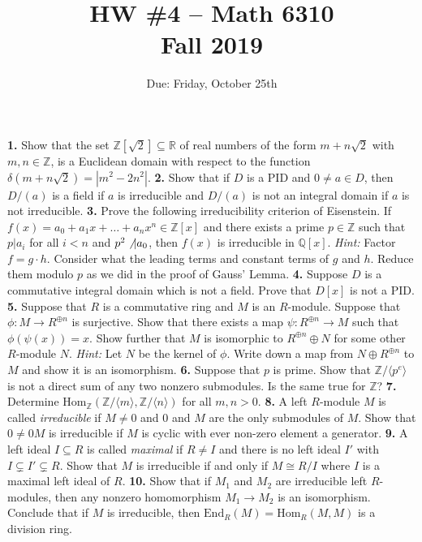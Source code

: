 \documentclass[11pt]{amsart}
\renewcommand{\to}[1][]{\xrightarrow{\ #1\ }}
\newcommand{\bR}{{\mathbb{R}}}
\newcommand{\bQ}{\mathbb{Q}}
\newcommand{\bZ}{\mathbb{Z}}
\newcommand{\Hom}{\mathrm{Hom}}
\newcommand{\End}{\mathrm{End}}
\begin{document}
\title{HW \#4 -- Math 6310\\Fall 2019}
\author{Due: Friday, October 25th}
\maketitle
\noindent
{\bf 1.}  Show that the set $\bZ[\sqrt{2}] \subseteq \bR$ of real numbers of the form $m + n \sqrt{2}$ with $m, n \in \bZ$, is a Euclidean domain with respect to the function $\delta(m + n\sqrt{2}) = |m^2 - 2n^2|$.  
\newpage
\noindent
{\bf 2.}  Show that if $D$ is a PID and $0 \neq a \in D$, then $D/(a)$ is a field if $a$ is irreducible and $D/(a)$ is not an integral domain if $a$ is not irreducible.
\newpage
\noindent
{\bf 3.}  Prove the following irreducibility criterion of Eisenstein.  If $f(x) = a_0 + a_1 x + \dots + a_n x^n \in \bZ[x]$ and there exists a prime $p \in \bZ$ such that $p | a_i$ for all $i < n$ and $p^2 \not\,| a_0$, then $f(x)$ is irreducible in $\bQ[x]$.  
\vskip 3pt
\emph{Hint:}  Factor $f = g \cdot h$.  Consider what the leading terms and constant terms of $g$ and $h$.  Reduce them modulo $p$ as we did in the proof of Gauss' Lemma.
\newpage
\noindent
{\bf 4.}  Suppose $D$ is a commutative integral domain which is not a field.  Prove that $D[x]$ is not a PID.
\newpage
\noindent
{\bf 5.}  Suppose that $R$ is a commutative ring and $M$ is an $R$-module.  Suppose that $\phi : M \to R^{\oplus n}$ is surjective.  
Show that there exists a map $\psi : R^{\oplus n} \to M$ such that $\phi(\psi(x)) = x$.  
\vskip 3pt
Show further that $M$ is isomorphic to $R^{\oplus n} \oplus N$ for some other $R$-module $N$.
\vskip 3pt
\emph{Hint: }  Let $N$ be the kernel of $\phi$.  Write down a map from $N \oplus R^{\oplus n}$ to $M$ and show it is an isomorphism.
\newpage
\noindent
{\bf 6.}  Suppose that $p$ is prime.  Show that $\bZ/\langle p^e \rangle$ is not a direct sum of any two nonzero submodules.  Is the same true for $\bZ$?
\newpage
\noindent
{\bf 7.}  Determine $\Hom_{\bZ}(\bZ/\langle m \rangle, \bZ/\langle n \rangle)$ for all $m, n > 0$.
\newpage
\noindent
{\bf 8.}  A left $R$-module $M$ is called \emph{irreducible} if $M \neq 0$ and $0$ and $M$ are the only submodules of $M$.  Show that $0 \neq 0M$ is irreducible if $M$ is cyclic with ever non-zero element a generator.
\newpage
\noindent
{\bf 9.}  A left ideal $I \subseteq R$ is called \emph{maximal} if $R \neq I$ and there is no left ideal $I'$ with $I \subsetneq I' \subsetneq R$.  Show that $M$ is irreducible if and only if $M \cong R/I$ where $I$ is a maximal left ideal of $R$.
\newpage
\noindent
{\bf 10.}  Show that if $M_1$ and $M_2$ are irreducible left $R$-modules, then any nonzero homomorphism $M_1 \to M_2$ is an isomorphism.  Conclude that if $M$ is irreducible, then $\End_R(M) = \Hom_R(M, M)$ is a division ring.
\end{document}
